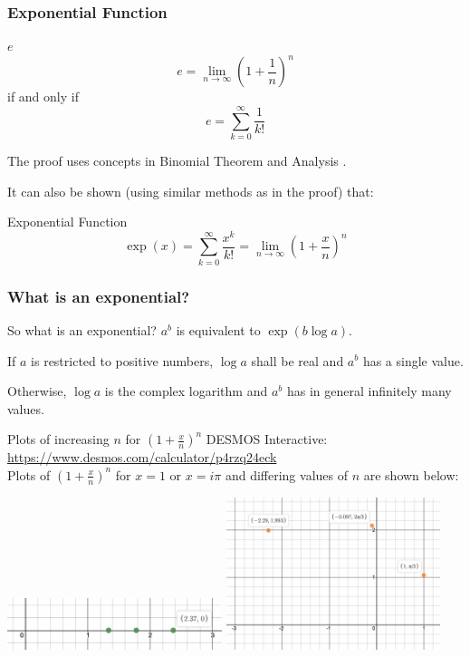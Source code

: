 \documentclass{beamer}
\begin{document}
\begin{frame}
  \frametitle{Exponential Function}
  \begin{block}{$e$}
    \[ e = \lim_{n\rightarrow \infty}\left(1 + \frac{1}{n}\right)^n \]
    if and only if
    \[ e = \sum_{k=0}^\infty \frac{1}{k!}\]
  \end{block}
  The proof uses concepts in Binomial Theorem and Analysis \parencite[pp.~64-65]{rudin}.

  It can also be shown (using similar methods as in the proof) that:
  \begin{block}{Exponential Function \parencite[p.~174]{rudin}}
    \[\exp(x) = \sum_{k=0}^\infty \frac{x^k}{k!} = \lim_{n\rightarrow\infty}\left(1 + \frac{x}{n}\right)^n \]
  \end{block}
\end{frame}

\begin{frame}
  \frametitle{What is an exponential?}
  \begin{block}{So what is an exponential? \parencite[p.~46]{ahlfors}}
    $a^b$ is equivalent to $\exp(b \log a)$.

    If $a$ is restricted to positive numbers, $\log a$ shall be real and $a^b$ has a single value.

    Otherwise, $\log a$ is the complex logarithm and $a^b$ has in general infinitely many values.
  \end{block}
\end{frame}

\begin{frame}
  \begin{block}{Plots of increasing $n$ for $(1 + \frac{x}{n})^n$}
  DESMOS Interactive: \url{https://www.desmos.com/calculator/p4rzq24eck}\\
  Plots of $(1+\frac{x}{n})^n$ for $x = 1$ or $x=i\pi$ and differing values of $n$ are shown below:
  \end{block}
  \begin{minipage}{\textwidth}
    \includegraphics[width=0.47\textwidth]{real_exp_3.png}
    \includegraphics[width=0.47\textwidth]{complex_exp_3.png}
  \end{minipage}
\end{frame}
\end{document}
